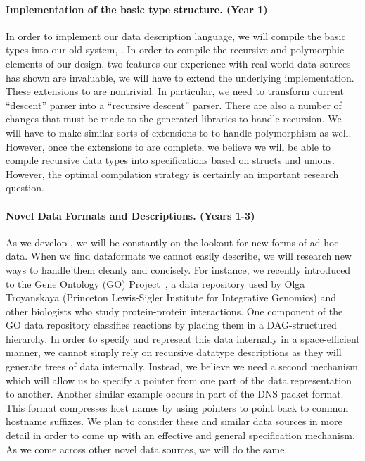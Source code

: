 \documentclass[11pt]{article}
\begin{document}

\paragraph*{Implementation of the basic type structure. (Year 1)}
In order to implement our data description language,
we will compile the basic types into our old system, \pads.
In order to compile the recursive and polymorphic
elements of our design, 
two features our experience with real-world data sources
has shown are invaluable,
we will have to extend the underlying \pads{}
implementation.  These extensions to \pads{}
are nontrivial.  In particular,
we need to transform \pads{} current ``descent'' parser into
a ``recursive descent'' parser.  
There are also a number of changes that must be made to
the generated libraries to handle recursion.  
We will have to make similar sorts of extensions
to \pads{} to handle polymorphism as well.  However,
once the extensions to \pads{} are complete,
we believe we will be able to compile recursive data types
into specifications based on \pads{} structs and unions.
However, the optimal compilation strategy is certainly
an important research question.

\paragraph*{Novel Data Formats and Descriptions. (Years 1-3)}
As we develop \datatype, we will be constantly
on the lookout for new forms of ad hoc data.  
When we find dataformats we cannot easily describe,
we will research new ways to handle them cleanly and concisely.
For instance, we recently introduced to the Gene Ontology (GO)
Project~\cite{geneontology}, a data repository used by Olga
Troyanskaya (Princeton Lewis-Sigler Institute for Integrative
Genomics) and other biologists who study protein-protein interactions.
One component of the GO data repository classifies reactions by
placing them in a DAG-structured hierarchy.  In order
to specify and represent this data internally in a 
space-efficient manner, we cannot simply rely on
recursive datatype descriptions as they will
generate trees of data internally.  Instead,
we believe we need a second mechanism which will allow us to specify
a pointer from one part of the data representation to another.
Another similar example occurs in
part of the DNS packet format.  This format compresses
host names by using pointers to point back to common
hostname suffixes. 
We plan to consider these and similar data sources in more detail
in order to come up with an effective and general specification mechanism.
As we come across other novel data sources, we will do the same.
\end{document}
